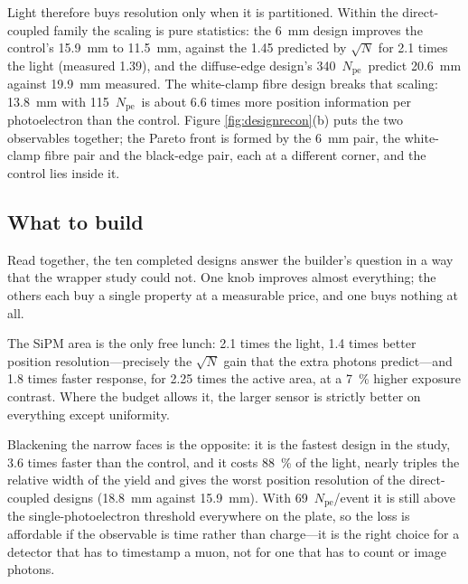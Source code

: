 \documentclass[11pt,a4paper]{article}
\newcommand{\pe}{\ensuremath{N_{\mathrm{pe}}}}
\begin{document}
Light therefore buys resolution only when it is partitioned. Within the
direct-coupled family the scaling is pure statistics: the \SI{6}{\milli\meter}
design improves the control's \SI{15.9}{\milli\meter} to
\SI{11.5}{\milli\meter}, against the \num{1.45} predicted by $\sqrt{N}$ for
\num{2.1} times the light (measured \num{1.39}), and the diffuse-edge design's
\num{340}~\pe\ predict \SI{20.6}{\milli\meter} against
\SI{19.9}{\milli\meter} measured. The white-clamp fibre design breaks that
scaling: \SI{13.8}{\milli\meter} with \num{115}~\pe\ is about \num{6.6} times
more position information per photoelectron than the control. Figure
\ref{fig:designrecon}(b) puts the two observables together; the Pareto front is
formed by the \SI{6}{\milli\meter} pair, the white-clamp fibre pair and the
black-edge pair, each at a different corner, and the control lies inside it.

\subsection{What to build}
\label{sec:design-what}

Read together, the ten completed designs answer the builder's question in a way that
the wrapper study could not. One knob improves almost everything; the others
each buy a single property at a measurable price, and one buys nothing at all.

The SiPM area is the only free lunch: \num{2.1} times the light,
\num{1.4} times better position resolution---precisely the $\sqrt{N}$ gain
that the extra photons predict---and \num{1.8} times faster response, for
\num{2.25} times the active area, at a \SI{7}{\percent} higher exposure
contrast. Where the budget allows it, the larger sensor is strictly better on
everything except uniformity.

Blackening the narrow faces is the opposite: it is the fastest design in the
study, \num{3.6} times faster than the control, and it costs
\SI{88}{\percent} of the light, nearly triples the relative width of the
yield and gives the worst position resolution of the direct-coupled designs
(\SI{18.8}{\milli\meter} against \SI{15.9}{\milli\meter}). With
\num{69}~\pe/event it is still above the single-photoelectron threshold
everywhere on the plate, so the loss is affordable if the observable is time
rather than charge---it is the right choice for a detector that has to
timestamp a muon, not for one that has to count or image photons.
\end{document}
